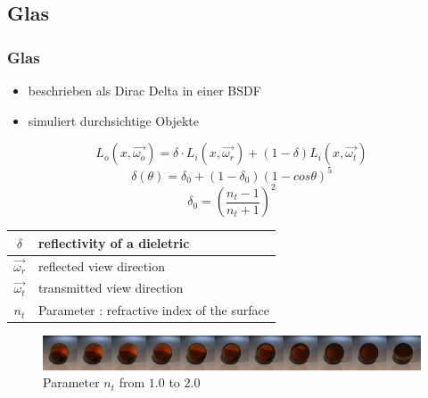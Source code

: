 \documentclass[11pt]{beamer}
\begin{document}
\subsection{Glas}
\begin{frame}[allowframebreaks]
\frametitle{Glas}
\begin{itemize}
\item beschrieben als Dirac Delta in einer BSDF
\item simuliert durchsichtige Objekte
\end{itemize}

\begin{equation}
L_o(x,\vec{\omega_o})= \delta \cdot L_i(x,\vec{\omega_r}) + (1-\delta) L_i(x,\vec{\omega_t})
\end{equation}
\begin{equation}
\delta(\theta) = \delta_0 + (1-\delta_0)(1-cos\theta)^5
\end{equation}
\begin{equation}
\delta_0 = \left(\frac{n_t-1}{n_t+1}\right)^2
\end{equation}
\begin{table}[H]
\begin{tabular}{| c | l |}
\hline
$\delta$ & reflectivity of a dieletric\\ \hline
$\vec{\omega_r}$ & reflected view direction\\ \hline
$\vec{\omega_t}$ & transmitted view direction\\ \hline
$n_t$ & Parameter : refractive index of the surface\\ \hline
\end{tabular}
\end{table}

\framebreak

\begin{figure}[H]
\caption{Parameter $n_t$ from $1.0$ to $2.0$}
\includegraphics[width=\textwidth]{../glasscomplete.png}
\end{figure}

\end{frame}
\end{document}
